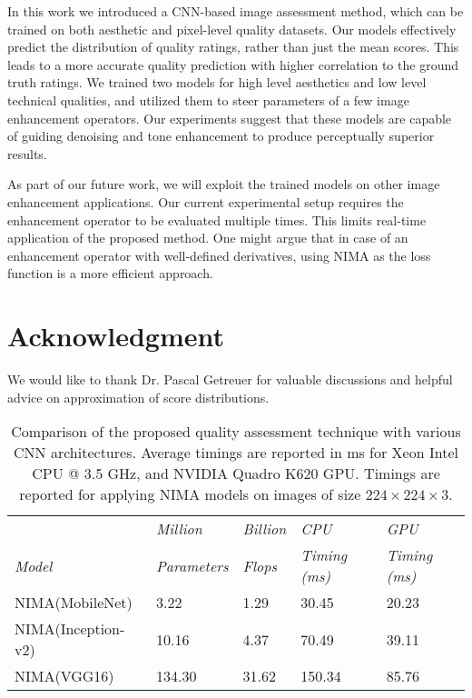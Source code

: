 \documentclass[10pt,twocolumn,twoside]{IEEEtran}
\begin{document}
In this work we introduced a CNN-based image assessment method, which can be trained on both aesthetic and pixel-level quality datasets. Our models effectively predict the distribution of quality ratings, rather than just the mean scores. This leads to a more accurate quality prediction with higher correlation to the ground truth ratings. We trained two models for high level aesthetics and low level technical qualities, and utilized them to steer parameters of a few image enhancement operators. Our experiments suggest that these models are capable of guiding denoising and tone enhancement to produce perceptually superior results. 

As part of our future work, we will exploit the trained models on other image enhancement applications. Our current experimental setup requires the enhancement operator to be evaluated multiple times. This limits real-time application of the proposed method. One might argue that in case of an enhancement operator with well-defined derivatives, using NIMA as the loss function is a more efficient approach.

\section*{Acknowledgment}
We would like to thank Dr. Pascal Getreuer for valuable discussions and helpful advice on approximation of score distributions.

\begin{table*}[!t]
\begin{center}
\captionsetup{width=0.5\textwidth}
\caption{Comparison of the proposed quality assessment technique with various CNN architectures. Average timings are reported in ms for Xeon Intel CPU @ 3.5 GHz, and NVIDIA Quadro K620 GPU. Timings are reported for applying NIMA models on images of size $224\times224\times3$.}
\begin{tabular}{@{} *5l @{}}    \toprule
 & \emph{Million} & \emph{Billion} & \emph{CPU} & \emph{GPU} \\
\emph{Model}  & \emph{Parameters} & \emph{Flops} & \emph{Timing (ms)}  & \emph{Timing (ms)} \\\midrule
NIMA(MobileNet)  & 3.22 & 1.29 &  30.45 &  20.23 \\
NIMA(Inception-v2)  & 10.16 & 4.37 &  70.49 &  39.11 \\
NIMA(VGG16)  & 134.30 & 31.62 &  150.34 &  85.76 \\\bottomrule
 \hline
\end{tabular}
\label{tab:time_comp}
\end{center}
\end{table*}

   
\end{document}
